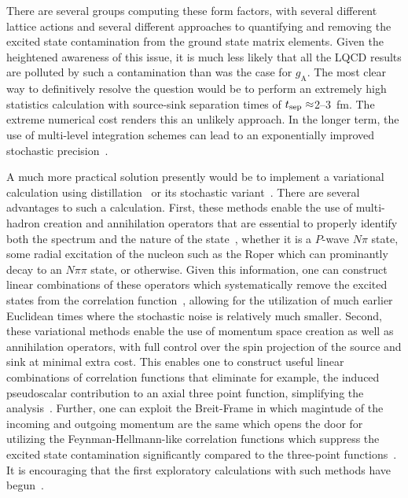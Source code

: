 \documentclass{ar-1col}
\def\tsep{t_{\rm sep}}
\begin{document}
There are several groups computing these form factors, with several different lattice actions and several different approaches to quantifying and removing the excited state contamination from the ground state matrix elements.
Given the heightened awareness of this issue, it is much less likely that all the LQCD results are polluted by such a contamination than was the case for $g_{\mathrm{A}}$.
The most clear way to definitively resolve the question would be to perform an extremely high statistics calculation with source-sink separation times of $\tsep\approx$2--3~fm.  The extreme numerical cost
renders this an unlikely approach.
In the longer term, the use of multi-level integration schemes can lead to an exponentially improved stochastic precision~\cite{Ce:2016idq}.

A much more practical solution presently would be to implement a variational calculation using distillation~\cite{HadronSpectrum:2009krc} or its stochastic variant~\cite{Morningstar:2011ka}.
There are several advantages to such a calculation.
First, these methods enable the use of multi-hadron creation and annihilation operators
 that are essential to properly identify both the spectrum and the nature of the state~\cite{Dudek:2012xn,Lang:2012db},
 whether it is a $P$-wave $N\pi$ state,
 some radial excitation of the nucleon such as the Roper
 which can prominantly decay to an $N\pi\pi$ state,
 or otherwise.
Given this information, one can construct linear combinations of these operators which systematically remove the excited states from the correlation function~\cite{Blossier:2009kd}, allowing for the utilization of much earlier Euclidean times where the stochastic noise is relatively much smaller.
Second, these variational methods enable the use of momentum space creation as well as annihilation operators, with full control over the spin projection of the source and sink at minimal extra cost.
This enables one to construct useful linear combinations of correlation functions that eliminate for example, the induced pseudoscalar contribution to an axial three point function, simplifying the analysis~\cite{Meyer:2017ddy}.
Further, one can exploit the Breit-Frame in which magintude of the incoming and outgoing momentum are the same which opens the door for utilizing the Feynman-Hellmann-like correlation functions which suppress the excited state contamination significantly compared to the three-point functions~\cite{He:2021yvm}.
It is encouraging that the first exploratory calculations with such methods have begun~\cite{Egerer:2018xgu,Barca:2021iak}.
\end{document}
